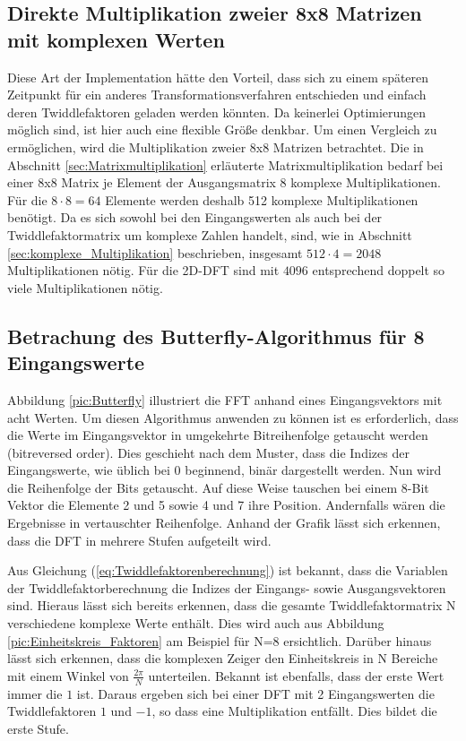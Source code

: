 \subsection{Direkte Multiplikation zweier 8x8 Matrizen mit komplexen Werten}
Diese Art der Implementation hätte den Vorteil, dass sich zu einem späteren Zeitpunkt für ein anderes
Transformationsverfahren entschieden und einfach deren Twiddlefaktoren geladen werden könnten.
Da keinerlei Optimierungen möglich sind, ist hier auch eine flexible Größe denkbar. Um einen Vergleich
zu ermöglichen, wird die Multiplikation zweier 8x8 Matrizen betrachtet.
Die in Abschnitt \ref{sec:Matrixmultiplikation} erläuterte Matrixmultiplikation bedarf bei einer 8x8 Matrix je Element der Ausgangsmatrix 8 komplexe Multiplikationen. Für
die $8\cdot8=64$ Elemente werden deshalb 512 komplexe Multiplikationen benötigt. Da es sich sowohl bei den Eingangswerten als auch bei der Twiddlefaktormatrix um komplexe
Zahlen handelt, sind, wie in Abschnitt \ref{sec:komplexe_Multiplikation} beschrieben, insgesamt $512\cdot4=2048$ Multiplikationen nötig.
Für die 2D-DFT sind mit $4096$ entsprechend doppelt so viele Multiplikationen nötig.



\subsection{Betrachung des Butterfly-Algorithmus für 8 Eingangswerte} 
Abbildung \ref{pic:Butterfly} illustriert die FFT anhand eines Eingangsvektors mit acht Werten. 
Um diesen Algorithmus anwenden zu können ist es erforderlich, dass die Werte im Eingangsvektor in umgekehrte Bitreihenfolge getauscht werden (bitreversed order).
Dies geschieht nach dem Muster, dass die Indizes der Eingangswerte, wie
üblich bei 0 beginnend, binär dargestellt werden. Nun wird die Reihenfolge der Bits getauscht. Auf diese Weise tauschen bei einem 8-Bit Vektor die
Elemente 2 und 5 sowie 4 und 7 ihre Position. Andernfalls wären die Ergebnisse in vertauschter Reihenfolge.
Anhand der Grafik lässt sich erkennen, dass die DFT in mehrere Stufen aufgeteilt wird.

Aus Gleichung (\ref{eq:Twiddlefaktorenberechnung}) ist 
bekannt, dass die Variablen der Twiddlefaktorberechnung die Indizes der Eingangs- sowie Ausgangsvektoren sind. Hieraus lässt sich bereits erkennen, dass
die gesamte Twiddlefaktormatrix N verschiedene komplexe Werte enthält. Dies wird auch aus Abbildung \ref{pic:Einheitskreis_Faktoren} am Beispiel für N=8 ersichtlich. 
Darüber hinaus lässt sich erkennen, dass die komplexen Zeiger den Einheitskreis 
in N Bereiche mit einem Winkel von $\frac{2 \pi}{N}$ unterteilen. Bekannt ist ebenfalls, dass der erste Wert immer die $1$ ist.
Daraus ergeben sich bei einer DFT mit 2 Eingangswerten die Twiddlefaktoren $1$ und $-1$, so dass eine Multiplikation entfällt. Dies bildet die erste Stufe.

